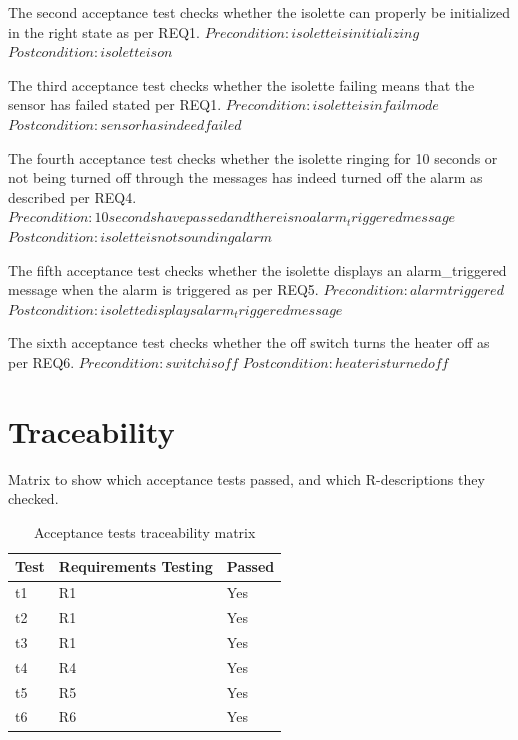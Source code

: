 \documentclass[fontsize=12pt,paper=letter,twoside]{scrartcl}
\begin{document}
\noindent The second acceptance test checks whether the isolette can properly be initialized in the right state as per REQ1.
$Precondition: isolette is initializing$
$Postcondition: isolette is on$


\noindent The third acceptance test checks whether the isolette failing means that the sensor has failed stated per REQ1.
$Precondition: isolette is in fail mode$
$Postcondition: sensor has indeed failed$


\noindent The fourth acceptance test checks whether the isolette ringing for 10 seconds or not being turned off through the messages has indeed turned off the alarm as described per REQ4.
$Precondition: 10 seconds have passed and there is no alarm_triggered message$
$Postcondition: isolette is not sounding alarm$


\noindent The fifth acceptance test checks whether the isolette displays an alarm_triggered message when the alarm is triggered as per REQ5.
$Precondition: alarm triggered$
$Postcondition: isolette displays alarm_triggered message$


\noindent The sixth acceptance test checks whether the off switch turns the heater off as per REQ6.
$Precondition: switch is off$
$Postcondition: heater is turned off$

\section{Traceability}
\FloatBarrier
Matrix to show which acceptance tests passed, and which R-descriptions they checked.

\begin{table}[htb]
\centering
\label{my-label}
\begin{tabular}{|l|l|l|}
\hline
Test & Requirements Testing & Passed \\ \hline
t1   & R1                   & Yes    \\ \hline
t2   & R1                   & Yes    \\ \hline
t3   & R1                   & Yes    \\ \hline
t4   & R4                   & Yes    \\ \hline
t5   & R5                   & Yes    \\ \hline
t6   & R6                   & Yes    \\ \hline
\end{tabular}
\caption{Acceptance tests traceability matrix}
\end{table}
\FloatBarrier



\end{document}
